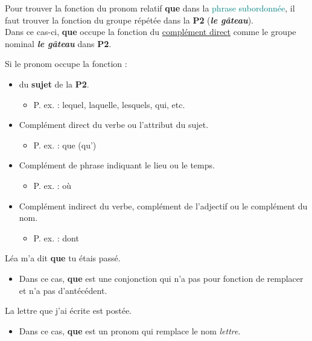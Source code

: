 \documentclass[10pt, french]{article}
\begin{document}
\begin{multicols*}{2}
\begin{definitionNOHFILLsub}
\begin{astuces}
Pour trouver la fonction du pronom relatif \textbf{que} dans la \textcolor{teal}{phrase subordonnée}, il faut trouver la fonction du groupe répétée dans la \textbf{P2} (\textit{\textbf{le gâteau}}).\\
Dans ce cas-ci, \textbf{que} occupe la fonction du \underline{complément direct} comme le groupe nominal \textit{\textbf{le gâteau}} dans \textbf{P2}.
\end{astuces}

Si le pronom occupe la fonction :
\begin{itemize}
	\item	du \textbf{sujet} de la \textbf{P2}.
		\begin{itemize}
		\item	P. ex. : lequel, laquelle, lesquels, qui, etc.
		\end{itemize}
	\item	Complément direct du verbe ou l'attribut du sujet.
		\begin{itemize}
		\item	P. ex. : que (qu')
		\end{itemize}
	\item	Complément de phrase indiquant le lieu ou le temps.
		\begin{itemize}
		\item	P. ex. : où
		\end{itemize}
	\item	Complément indirect du verbe, complément de l'adjectif ou le complément du nom.
		\begin{itemize}
		\item	P. ex. : dont
		\end{itemize}
\end{itemize}
\end{definitionNOHFILLsub}

\begin{astuces}
Léa m'a dit \textbf{que} tu étais passé.
\begin{itemize}
	\item	Dans ce cas, \textbf{que} est une conjonction qui n'a pas pour fonction de remplacer et n'a pas d'antécédent.
\end{itemize}

La lettre que j'ai écrite est postée.
\begin{itemize}
	\item	Dans ce cas, \textbf{que} est un pronom qui remplace le nom \textit{lettre}.
\end{itemize}
\end{astuces}


\end{multicols*}
\end{document}
